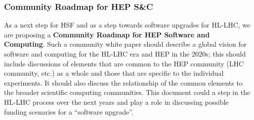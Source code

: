 \begin{frame}
\frametitle{Community Roadmap for HEP S\&C}

\noindent As a next step for HSF and as a step towards software upgrades for HL-LHC, we are proposing a {\bf Community Roadmap for HEP Software and Computing}.  Such a community white paper should describe a global
vision for software and computing for the HL-LHC era and HEP in the 2020s;
this should include discussions of elements that are common to
the HEP community (LHC community, etc.) as a whole and those that are specific
to the individual experiments. It should also discuss the relationship of the 
common elements to the broader scientific computing communities.
\vskip 0.15in
This document could a step in the HL-LHC process over the next years and play a role in discussing possible funding scenaries for a ``software upgrade''.

\end{frame}


